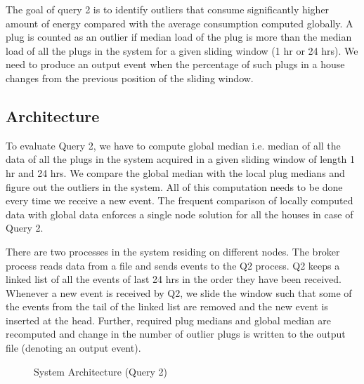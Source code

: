 The goal of query 2 is to identify outliers that consume significantly higher amount of energy compared with the average consumption computed globally.
A plug is counted as an outlier if median load of the plug is more than the median load of all the plugs in the system for a given sliding window (1 hr or 24 hrs).
We need to produce an output event when the percentage of such plugs in a house changes from the previous position of the sliding window.


\subsection{Architecture}
To evaluate Query 2, we have to compute global median i.e.
median of all the data of all the plugs in the system acquired in a given sliding window of length 1 hr and 24 hrs.
We compare the global median with the local plug medians and figure out the outliers in the system.
All of this computation needs to be done every time we receive a new event.
The frequent comparison of locally computed data with global data enforces a single node solution for all the houses in case of Query 2.

There are two processes in the system residing on different nodes.
The broker process reads data from a file and sends events to the Q2 process.
Q2 keeps a linked list of all the events of last 24 hrs in the order they have been received.
Whenever a new event is received by Q2, we slide the window such that some of the events from the tail of the linked list are removed and the new event is inserted at the head.
Further, required plug medians and global median are recomputed and change in the number of outlier plugs is written to the output file (denoting an output event).

\begin{figure}[h]
\begin{center}
\caption{System Architecture (Query 2)}
\end{center}
\end{figure}
\vspace*{-0.3cm}

